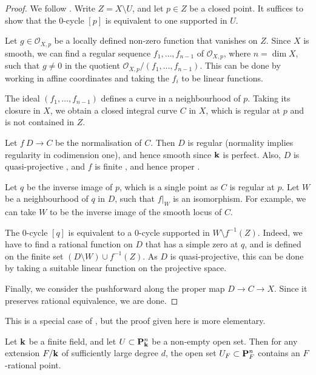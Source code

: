\begin{proof}
    We follow \cite[Complément]{colliot-finitude}.
    Write $Z = X \setminus U$, and let $p \in Z$ be a closed point.
    It suffices to show that the $0$-cycle $[p]$ is equivalent to one supported in $U$.

    Let $g \in \mathscr{O}_{X,p}$ be a locally defined non-zero function that vanishes on $Z$.
    Since $X$ is smooth, we can find a regular sequence $f_1, \dotsc, f_{n-1}$
    of $\mathscr{O}_{X,p}$, where $n = \dim X$, 
    such that $g \neq 0$ in the quotient $\mathscr{O}_{X,p} / (f_1, \dotsc, f_{n-1})$.
    This can be done by working in affine coordinates and taking the $f_i$ to be linear functions.

    The ideal $(f_1, \dotsc, f_{n-1})$ defines a curve in a neighbourhood of $p$.
    Taking its closure in $X$, we obtain a closed integral curve $C$ in $X$,
    which is regular at $p$ and is not contained in $Z$. 

    Let $f \: D \to C$ be the normalisation of $C$.
    Then $D$ is regular (normality implies regularity in codimension one),
    and hence smooth since $\bbk$ is perfect.
    Also, $D$ is quasi-projective \cite[Corollary~7.4.10]{EGA2},
    and $f$ is finite \cite[Corollary~7.4.6]{EGA2}, and hence proper \cite[Corollary~6.1.11]{EGA2}.
    
    Let $q$ be the inverse image of $p$, which is a single point as $C$ is regular at $p$.
    Let $W$ be a neighbourhood of $q$ in $D$, such that $f|_W$ is an isomorphism.
    For example, we can take $W$ to be the inverse image of the smooth locus of $C$.

    The $0$-cycle $[q]$ is equivalent to a $0$-cycle supported in $W \setminus f^{-1} (Z)$.
    Indeed, we have to find a rational function on $D$ 
    that has a simple zero at $q$, and is defined on the finite set $(D \setminus W) \cup f^{-1}(Z)$.
    As $D$ is quasi-projective, this can be done by taking a suitable linear function on the projective space.

    Finally, we consider the pushforward along the proper map $D \to C \to X$.
    Since it preserves rational equivalence, we are done.
\end{proof}

\begin{remark}
    This is a special case of \cite[Proposition~7.4.9]{EGA2},
    but the proof given here is more elementary.
\end{remark}

\begin{lemma} \label{lem-2-finite}
    Let $\bbk$ be a finite field, and let $U \subset \bbP_{\bbk}^n$ be a non-empty open set.
    Then for any extension $F / \bbk$ of sufficiently large degree $d$,
    the open set $U_F \subset \bbP_{F}^n$ contains an $F$-rational point.
\end{lemma}

